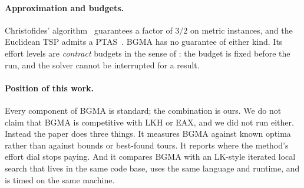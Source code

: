 \paragraph{Approximation and budgets.}
Christofides' algorithm~\citep{christofides1976} guarantees a factor of $3/2$ on metric instances, and
the Euclidean TSP admits a PTAS~\citep{arora1998}. BGMA has no guarantee of either kind. Its effort
levels are \emph{contract} budgets in the sense of \citet{zilberstein1996}: the budget is fixed before
the run, and the solver cannot be interrupted for a result.

\paragraph{Position of this work.}
Every component of BGMA is standard; the combination is ours. We do not claim that BGMA is
competitive with LKH or EAX, and we did not run either. Instead the paper does three things. It
measures BGMA against known optima rather than against bounds or best-found tours. It reports where
the method's effort dial stops paying. And it compares BGMA with an LK-style iterated local search that
lives in the same code base, uses the same language and runtime, and is timed on the same machine.

